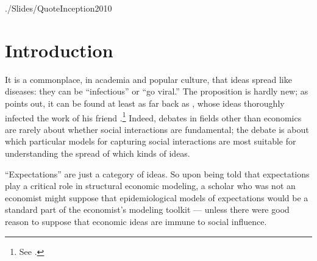 \begin{frontmatter}
\begin{verbatimwrite}{./Slides/QuoteInception2010}
\begin{quote}
\end{quote}
\end{verbatimwrite} %


\end{frontmatter}%

\section{Introduction}
\label{chap1:sec1}

It is a commonplace, in academia and popular culture, that ideas spread like diseases: they can be ``infectious'' or ``go viral.''  The proposition is hardly new; as \cite{shiller2017narrative} points out, it can be found at least as far back as \cite{humeenquiry},
 whose ideas thoroughly infected the work of his friend \cite{smithwealth}.\footnote{See \cite{rasmussen2017infidel}.} Indeed, %
 debates in fields other than economics are rarely about whether social interactions are fundamental; the debate is about which particular models for capturing social interactions are most suitable for understanding the spread of which kinds of ideas.

``Expectations'' are just a category of ideas.  So upon being told that expectations play a critical role in structural economic modeling, a scholar who was not an economist might suppose that epidemiological models of  expectations would be a standard part of the economist's modeling toolkit --- unless there were good reason to suppose that economic ideas are immune to social influence.

